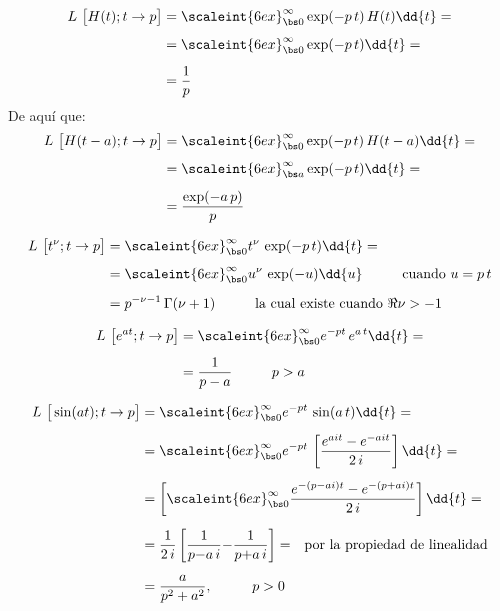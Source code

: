 \begin{ejemplo}
\begin{align*}
L \big[H(t); t \to p\big] &= \scaleint{6ex}_{\bs 0}^{\infty} \exp(- p \, t) \, H(t) \dd{t} = \\[0.5em]
&= \scaleint{6ex}_{\bs 0}^{\infty} \exp(- p \, t) \dd{t} = \\[0.5em]
&= \dfrac{1}{p}
\end{align*}
De aquí que:
\begin{align*}
L \big[H(t - a); t \to p\big] &= \scaleint{6ex}_{\bs 0}^{\infty} \exp(- p \, t) \, H(t - a) \dd{t} = \\[0.5em]
&= \scaleint{6ex}_{\bs a}^{\infty} \exp(- p \, t) \dd{t} = \\[0.5em]
&= \dfrac{\exp(-a \, p)}{p}
\end{align*}
\end{ejemplo}
\begin{ejemplo}
\begin{align*}
L \big[t^{\nu}; t \to p\big] &= \scaleint{6ex}_{\bs 0}^{\infty} t^{\nu} \, \exp(- p \, t) \dd{t} = \\[0.5em]
&= \scaleint{6ex}_{\bs 0}^{\infty} u^{\nu} \, \exp(-u) \dd{u} \hspace{1cm} \mbox{cuando  } u = p \, t \\[0.5em]
&= p^{-\nu - 1} \, \Gamma (\nu + 1) \hspace{1cm} \mbox{la cual existe cuando  } \Re{\nu} > - 1
\end{align*}
\end{ejemplo}
\begin{ejemplo}
\begin{align*}
L \big[e^{a t}; t \to p\big] &= \scaleint{6ex}_{\bs 0}^{\infty} e^{-p t} \, e^{a \, t} \dd{t} = \\[0.5em]
&= \dfrac{1}{p - a} \hspace{1cm} p > a
\end{align*}
\end{ejemplo}
\begin{ejemplo}
\begin{align*}
L \big[\sin (a t); t \to p\big] &= \scaleint{6ex}_{\bs 0}^{\infty} e^{-p t} \, \sin (a \, t) \dd{t} = \\[0.5em]
&= \scaleint{6ex}_{\bs 0}^{\infty} e^{-p t} \,\left[ \dfrac{e^{a i t} - e^{- a i t}}{2 \, i} \right] \dd{t} = \\[0.5em]
&= \left[ \scaleint{6ex}_{\bs 0}^{\infty}  \dfrac{e^{-(p - a i) t} - e^{- (p + a i) t}}{2 \, i} \right] \dd{t} = \\[0.5em]
&= \dfrac{1}{2 \, i} \left[ \dfrac{1}{p {-} a \, i} {-} \dfrac{1}{p {+} a \, i} \right] = \hspace{0.25cm} \mbox{por la propiedad de linealidad} \\[0.5em]
&= \dfrac{a}{p^{2} + a^{2}}, \hspace{1cm} p > 0
\end{align*}
\end{ejemplo}
